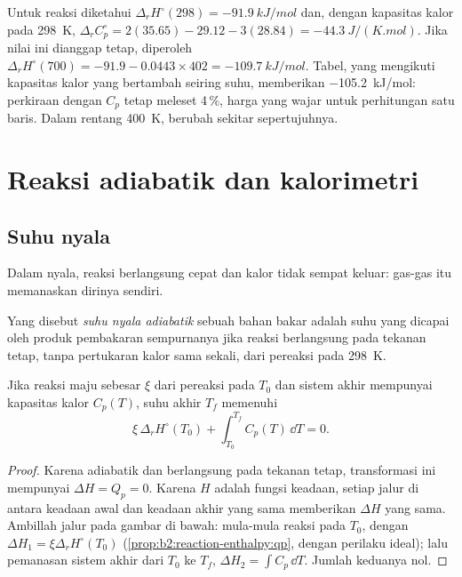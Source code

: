 \begin{example}\label{ex:b2:reaction-enthalpy:kirchhoff}
Untuk reaksi  diketahui $\Delta_r H^\circ(298) =
\qty{-91.9}{kJ/mol}$ dan, dengan kapasitas kalor pada \qty{298}{K},
$\Delta_r C_p^\circ = 2(35.65) - 29.12 - 3(28.84) =
\qty{-44.3}{J/(K.mol)}$. Jika nilai ini dianggap tetap, diperoleh
$\Delta_r
H^\circ(700) = -91.9 - 0.0443 \times 402 = \qty{-109.7}{kJ/mol}$.
Tabel, yang mengikuti kapasitas kalor yang bertambah seiring suhu,
memberikan \qty{-105.2}{kJ/mol}: perkiraan dengan $C_p$ tetap meleset
4\,\%, harga yang wajar untuk perhitungan satu baris. Dalam rentang
\qty{400}{K},  berubah sekitar sepertujuhnya.
\end{example}

\section{Reaksi adiabatik dan kalorimetri}

\subsection*{Suhu nyala}

Dalam nyala, reaksi berlangsung cepat dan kalor tidak sempat keluar: gas-gas
itu memanaskan dirinya sendiri.

\begin{definition}\label{def:b2:reaction-enthalpy:flame-temperature}
Yang disebut \emph{suhu nyala adiabatik}
sebuah bahan bakar adalah suhu yang dicapai oleh produk pembakaran
sempurnanya jika reaksi berlangsung pada tekanan tetap, tanpa pertukaran
kalor sama sekali, dari pereaksi pada \qty{298}{K}.
\end{definition}

\begin{proposition}\label{prop:b2:reaction-enthalpy:flame}
Jika reaksi maju sebesar $\xi$ dari pereaksi pada $T_0$ dan sistem akhir
mempunyai kapasitas kalor $C_p(T)$, suhu akhir $T_f$ memenuhi
\[
  \xi\,\Delta_r H^\circ(T_0) + \int_{T_0}^{T_f}C_p(T)\,\dd T = 0 .
\]
\end{proposition}

\begin{proof}
Karena adiabatik dan berlangsung pada tekanan tetap, transformasi ini
mempunyai $\Delta H =
Q_p = 0$. Karena $H$ adalah fungsi keadaan, setiap
jalur di antara keadaan awal dan keadaan akhir yang sama memberikan
$\Delta H$ yang sama. Ambillah jalur pada gambar di bawah: mula-mula reaksi
pada $T_0$, dengan $\Delta H_1 = \xi\Delta_r H^\circ(T_0)$
(\cref{prop:b2:reaction-enthalpy:qp}, dengan perilaku ideal); lalu
pemanasan sistem akhir dari $T_0$ ke $T_f$, $\Delta H_2 = \int C_p\,\dd T$.
Jumlah keduanya nol.
\end{proof}

